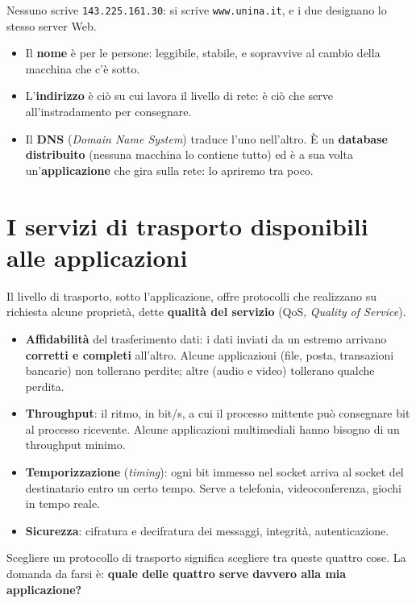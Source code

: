 Nessuno scrive \texttt{143.225.161.30}: si scrive \texttt{www.unina.it}, e i due designano lo stesso server Web.
\begin{itemize}
    \item Il \textbf{nome} è per le persone: leggibile, stabile, e sopravvive al cambio della macchina che c'è sotto.
    \item L'\textbf{indirizzo} è ciò su cui lavora il livello di rete: è ciò che serve all'instradamento per consegnare.
    \item Il \textbf{DNS} (\emph{Domain Name System}) traduce l'uno nell'altro. È un \textbf{database distribuito}
          (nessuna macchina lo contiene tutto) ed è a sua volta un'\textbf{applicazione} che gira sulla rete: lo
          apriremo tra poco.
\end{itemize}

\section{I servizi di trasporto disponibili alle applicazioni}

Il livello di trasporto, sotto l'applicazione, offre protocolli che realizzano su richiesta alcune
proprietà, dette \textbf{qualità del servizio} (QoS, \emph{Quality of Service}).

\begin{itemize}
    \item \textbf{Affidabilità} del trasferimento dati: i dati inviati da un estremo arrivano
          \textbf{corretti e completi} all'altro. Alcune applicazioni (file, posta, transazioni bancarie)
          non tollerano perdite; altre (audio e video) tollerano qualche perdita.
    \item \textbf{Throughput}: il ritmo, in bit/s, a cui il processo mittente può consegnare bit al
          processo ricevente. Alcune applicazioni multimediali hanno bisogno di un throughput minimo.
    \item \textbf{Temporizzazione} (\emph{timing}): ogni bit immesso nel socket arriva al socket del
          destinatario entro un certo tempo. Serve a telefonia, videoconferenza, giochi in tempo reale.
    \item \textbf{Sicurezza}: cifratura e decifratura dei messaggi, integrità, autenticazione.
\end{itemize}

Scegliere un protocollo di trasporto significa scegliere tra queste quattro cose. La domanda da farsi è:
\textbf{quale delle quattro serve davvero alla mia applicazione?}


